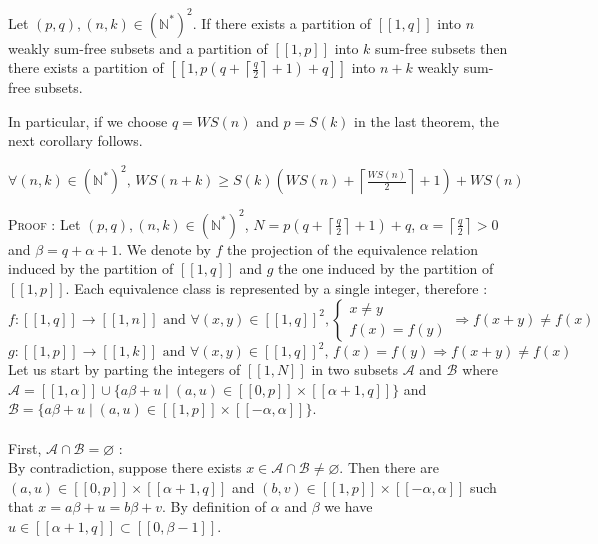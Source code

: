 \begin{theorem}
Let \((p,q), (n,k) \in (\mathbb{N}^*)^2\). If there exists a partition of \([\![1,q]\!]\) into \(n\) weakly sum-free
subsets and a partition of \([\![1,p]\!]\) into \(k\) sum-free
subsets then there exists a partition of \([\![1,p(q+\left \lceil \frac{q}{2} \right \rceil + 1)+q]\!]\) into \(n+k\)
weakly sum-free subsets.
\end{theorem}
In particular, if we choose \(q = WS(n)\) and \(p = S(k)\) in the last theorem, the next corollary follows.
\begin{corollary}
\( \forall (n,k) \in (\mathbb{N}^*)^2 \text{, } WS(n+k) \geqslant S(k) \left (WS(n) + \left \lceil \frac{WS(n)}{2}
\right \rceil +1 \right) + WS(n)\)
\end{corollary}
\textsc{Proof :} Let \((p,q), (n,k) \in (\mathbb{N}^*)^2\), \(N = p(q+\left \lceil \frac{q}{2} \right \rceil + 1)+q\),
\(\alpha = \left \lceil \frac{q}{2} \right \rceil > 0\) and \(\beta = q + \alpha + 1\).
We denote by \(f\) the projection of the equivalence relation induced by the partition of \([\![1,q]\!]\) and \(g\) the
one induced by the partition of \([\![1,p]\!]\). Each equivalence class is represented by a single integer, therefore :
\[ f : [\![1,q]\!] \longrightarrow [\![1,n]\!] \text{ and } \forall (x,y) \in [\![1,q]\!]^2, \left\{
\begin{array}{ll}
	x \neq y \\
	f(x) = f(y)
\end{array}
\right.
\Longrightarrow f(x+y) \neq f(x)
\]
\[g : [\![1,p]\!] \longrightarrow [\![1,k]\!] \text{ and } \forall (x,y) \in [\![1,q]\!]^2 \text{, } f(x) = f(y)
\Longrightarrow f(x+y) \neq f(x)
\]
Let us start by parting the integers of \([\![1,N]\!]\) in two subsets \(\mathcal{A}\) and \(\mathcal{B}\) where
\(\mathcal{A} = [\![1,\alpha]\!] \cup \{a\beta + u \mid (a,u) \in [\![0,p]\!] \times [\![\alpha + 1,q]\!]\}\) and
\(\mathcal{B} = \{a\beta + u \mid (a,u) \in [\![1,p]\!] \times [\![-\alpha,\alpha]\!]\}\).\\
\\
First, \underline{\(\mathcal{A} \cap \mathcal{B} = \varnothing\)} : \\
By contradiction, suppose there exists \(x \in \mathcal{A} \cap \mathcal{B} \neq \varnothing \). Then there are \((a,u)
\in [\![0,p]\!] \times [\![\alpha + 1,q]\!]\) and \((b,v) \in [\![1,p]\!] \times [\![-\alpha,\alpha]\!]\) such that \(x
= a\beta + u = b\beta +v\). By definition of \(\alpha\) and \(\beta\) we have \(u \in [\![\alpha + 1,q]\!] \subset
[\![0,\beta - 1]\!]\).
